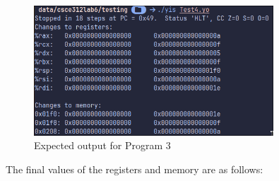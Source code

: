\documentclass{article}
\begin{document}
\begin{figure}[H]
    \centering
    \includegraphics[width=0.8\textwidth]{./images/test4_out.png}
    \caption{Expected output for Program 3}
\end{figure}

The final values of the registers and memory are as follows:
\end{document}
